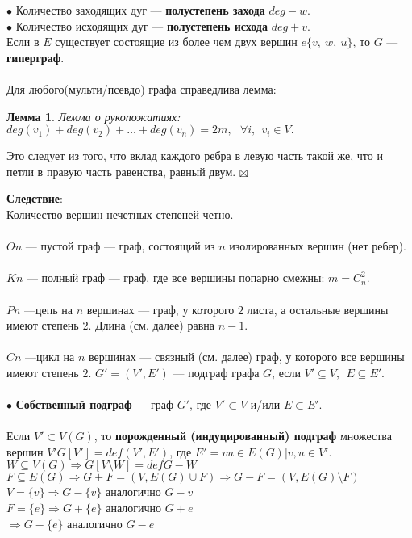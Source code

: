 \documentclass[a4paper, 12pt]{report}
\newenvironment{Proof} %
{\par\noindent{$\blacklozenge$}} %
{\hfill$\scriptstyle\boxtimes$} %
\newtheorem*{lemma}{Лемма} %
\begin{document}
$ \bullet $ Количество заходящих дуг — \textbf{полустепень захода} $ deg - w $. \\

$ \bullet $ Количество исходящих дуг — \textbf{полустепень исхода} $ deg + v $.\\
Если в $ E $ существует состоящие из более чем двух вершин $e\{ v,~ w,~ u\}$, то $G$ —\textbf{гиперграф}.\\\\
Для любого(мульти/псевдо) графа справедлива лемма:
\begin{lemma} Лемма о рукопожатиях:\\
$ deg(v_1) + deg(v_2)+ \dotso + deg(v_n) = 2m, ~~~ \forall i,~~ v_i\in V.  $
\end{lemma}
\begin{Proof}
Это следует из того, что вклад каждого ребра в левую часть такой же, что и петли в правую часть равенства, равный двум.
\end{Proof}

\textbf{Следствие}:\\
 Количество вершин нечетных степеней четно.\\\\
$On$ — пустой граф — граф, состоящий из $ n $ изолированных вершин (нет ребер).\\\\
$ Kn $ — полный граф — граф, где все вершины попарно смежны: $m=C_n^2$.\\\\
$ Pn $ —цепь на $ n $ вершинах — граф, у которого $2$ листа, а остальные вершины имеют степень $2$. Длина (см. далее) равна $n-1$.\\\\
$ Cn $ —цикл на $ n $ вершинах — связный (см. далее) граф, у которого все вершины имеют степень $ 2 $.
$G'=(V',E')$ — подграф графа $G$, если $V'\subseteq V,~~ E\subseteq E'$.\\\\
$ \bullet $ \textbf{Собственный подграф} — граф $G'$, где $V'⊂V$ и/или $E⊂E'$.\\\\
Если $V'⊂V(G)$, то \textbf{порожденный (индуцированный) подграф} множества вершин $V' G[V'] =def(V',E')$, где $E'={vu \in E(G) | v, u \in V'}$.\\
$W\subseteq V(G) \Rightarrow G[V\setminus W]=def G-W$\\
$F\subseteq E(G) \Rightarrow G+F = (V, E(G)\cup F) \Rightarrow G-F = (V, E(G)\setminus F)$\\
$V=\{v\} \Rightarrow G - \{v\}$ аналогично $G - v$\\
$F=\{e\} \Rightarrow G+\{e\}$ аналогично $G + e$\\
$\Rightarrow G-\{e\}$ аналогично $G - e$\\\\
\end{document}
